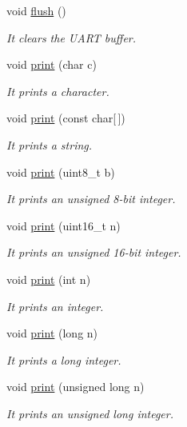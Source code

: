 \begin{DoxyCompactItemize}
void \hyperlink{class_wasp_u_s_b_aa9b5b58cc89424ca30fd269baf7fe3df}{flush} ()
\begin{DoxyCompactList}\small\item\em It clears the U\+A\+RT buffer. \end{DoxyCompactList}\item 
void \hyperlink{class_wasp_u_s_b_a5389582bec205db84d73343d83ab64d7}{print} (char c)
\begin{DoxyCompactList}\small\item\em It prints a character. \end{DoxyCompactList}\item 
void \hyperlink{class_wasp_u_s_b_a69256440353991662e47f87ca7e9de91}{print} (const char\mbox{[}$\,$\mbox{]})
\begin{DoxyCompactList}\small\item\em It prints a string. \end{DoxyCompactList}\item 
void \hyperlink{class_wasp_u_s_b_a2e644d10832552b0683cf75efcf73364}{print} (uint8\+\_\+t b)
\begin{DoxyCompactList}\small\item\em It prints an unsigned 8-\/bit integer. \end{DoxyCompactList}\item 
void \hyperlink{class_wasp_u_s_b_a64175df998af81d1cb8267a8b6d003e9}{print} (uint16\+\_\+t n)
\begin{DoxyCompactList}\small\item\em It prints an unsigned 16-\/bit integer. \end{DoxyCompactList}\item 
void \hyperlink{class_wasp_u_s_b_a3e13e6c385b42c8054161ba7c9fd8d3d}{print} (int n)
\begin{DoxyCompactList}\small\item\em It prints an integer. \end{DoxyCompactList}\item 
void \hyperlink{class_wasp_u_s_b_a9e5edc353722483d3c645c1853671a90}{print} (long n)
\begin{DoxyCompactList}\small\item\em It prints a long integer. \end{DoxyCompactList}\item 
void \hyperlink{class_wasp_u_s_b_af1806551de1377607e3afae872e38c76}{print} (unsigned long n)
\begin{DoxyCompactList}\small\item\em It prints an unsigned long integer. \end{DoxyCompactList}\item 

\end{DoxyCompactItemize}
